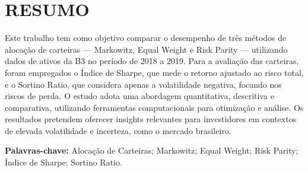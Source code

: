 
\chapter*{RESUMO}

\vspace{1cm}

Este trabalho tem como objetivo comparar o desempenho de três métodos de alocação de carteiras --- Markowitz, Equal Weight e Risk Parity --- utilizando dados de ativos da B3 no período de 2018 a 2019. Para a avaliação das carteiras, foram empregados o Índice de Sharpe, que mede o retorno ajustado ao risco total, e o Sortino Ratio, que considera apenas a volatilidade negativa, focando nos riscos de perda. O estudo adota uma abordagem quantitativa, descritiva e comparativa, utilizando ferramentas computacionais para otimização e análise. Os resultados pretendem oferecer insights relevantes para investidores em contextos de elevada volatilidade e incerteza, como o mercado brasileiro.

\vspace{0.5cm}

\noindent
\textbf{Palavras-chave:} Alocação de Carteiras; Markowitz; Equal Weight; Risk Parity; Índice de Sharpe; Sortino Ratio.
